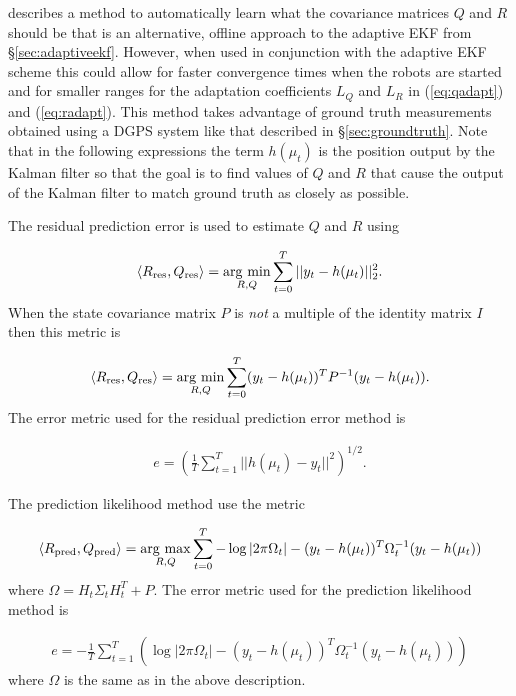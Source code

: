 \cite{Abbeel-RSS-05} describes a method to automatically learn what the covariance matrices $Q$ and $R$ should be that is an alternative, offline approach to the adaptive EKF from \S\ref{sec:adaptiveekf}. However, when used in conjunction with the adaptive EKF scheme this could allow for faster convergence times when the robots are started and for smaller ranges for the adaptation coefficients $L_Q$ and $L_R$ in (\ref{eq:qadapt}) and (\ref{eq:radapt}). This method takes advantage of ground truth measurements obtained using a DGPS system like that described in \S\ref{sec:groundtruth}. Note that in the following expressions the term $h(\mu_t)$ is the position output by the Kalman filter so that the goal is to find values of $Q$ and $R$ that cause the output of the Kalman filter to match ground truth as closely as possible.

The residual prediction error is used to estimate $Q$ and $R$ using

\begin{align*}
\left<R_{\text{res}},Q_{\text{res}}\right> = \mathop{\arg\,\min}\limits_{R,Q}\sum_{t=0}^T ||y_t-h(\mu_t)||_2^2.
\end{align*}
When the state covariance matrix $P$ is \textit{not} a multiple of the identity matrix $I$ then this metric is

\begin{align*}
\left<R_{\text{res}},Q_{\text{res}}\right> = \mathop{\arg\,\min}\limits_{R,Q}\sum_{t=0}^T (y_t-h(\mu_t))^TP^{-1}(y_t-h(\mu_t)).
\end{align*}
The error metric used for the residual prediction error method is

\begin{align}
\label{eq:kftrainingres}
e = \left(\frac{1}{T}\sum_{t=1}^T ||h(\mu_t)-y_t||^2\right)^{1/2}.
\end{align}

The prediction likelihood method use the metric

\begin{align*}
\left<R_{\text{pred}},Q_{\text{pred}}\right> = \mathop{\arg\,\max}\limits_{R,Q}\sum_{t=0}^T -\log|2\pi\Omega_t| - (y_t-h(\mu_t))^T\Omega_t^{-1}(y_t-h(\mu_t))
\end{align*}
where $\Omega = H_t\Sigma_tH_t^T+P$. The error metric used for the prediction likelihood method is

\begin{align}
\label{eq:kftrainingpred}
e = -\frac{1}{T}\sum_{t=1}^T \left(\log|2\pi\Omega_t| - (y_t-h(\mu_t))^T\Omega_t^{-1}(y_t-h(\mu_t))\right)
\end{align}
where $\Omega$ is the same as in the above description.

